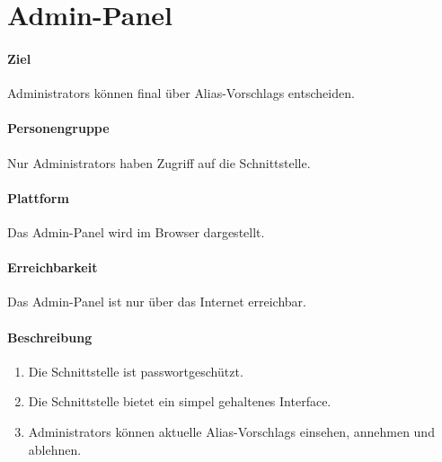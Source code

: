 \section{Admin-Panel}
\label{Admin-Panel}
\paragraph{Ziel}
\Glspl{Administrator} können final über \Glspl{Alias-Vorschlag} entscheiden.
\paragraph{Personengruppe}
Nur \Glspl{Administrator} haben Zugriff auf die \Gls{Schnittstelle}.
\paragraph{Plattform}
Das \Gls{Admin-Panel} wird im Browser dargestellt.
\paragraph{Erreichbarkeit}
Das \Gls{Admin-Panel} ist nur über das Internet erreichbar. 

\paragraph{Beschreibung}
\begin{enumerate}
    \item Die \Gls{Schnittstelle} ist passwortgeschützt.
    \item Die \Gls{Schnittstelle} bietet ein simpel gehaltenes Interface.
    \item \Glspl{Administrator} können aktuelle \Glspl{Alias-Vorschlag} einsehen, annehmen und ablehnen.
\end{enumerate}